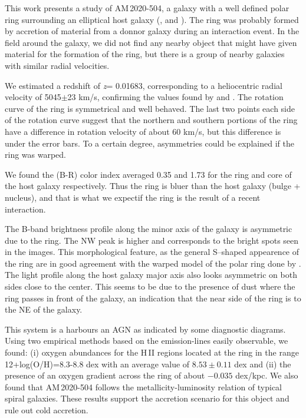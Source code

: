 \documentclass[useAMS,usenatbib]{mn2e}
\begin{document}
This work presents a study of \mbox{AM\,2020-504}, a galaxy with a well defined
polar ring surrounding an elliptical host galaxy (\citealt{1987IAUS..127..413W},
\citealt{1993A&A...267...21A} and \citealt{2002A&A...391..103I}). The ring was
probably formed by accretion of material from a donnor galaxy during an
interaction event. In the field around the galaxy, we did not find any nearby
object that might have given material for the formation of the ring, but there
is a group of nearby galaxies with similar radial velocities.

We estimated a redshift of \textit{z}= 0.01683, corresponding to a heliocentric
radial velocity of 5045$\pm$23 km/s, confirming the values found by
\cite{1987IAUS..127..413W} and \cite{1993A&A...267...21A}. The rotation curve of
the ring is symmetrical and well behaved. The last two points each side of the
rotation curve suggest that the northern and southern portions of the ring have
a difference in rotation velocity of about 60 km/s, but this difference is under
the error bars. To a certain degree, asymmetries could be explained if the ring
was warped.

We found the (B-R) color index averaged 0.35 and 1.73 for the ring and core of
the host galaxy respectively. Thus the ring is bluer than the host galaxy (bulge
+ nucleus), and that is what we expectif the ring is the result of a recent
interaction.

The B-band brightness profile along the minor axis of the
galaxy is asymmetric due to the ring. The NW peak is higher and corresponds to
the bright spots seen in the images. This morphological feature, as the general
S--shaped appearence of the ring are in good agreement with the warped model of
the polar ring done by \cite{1993A&A...267...21A}. The light profile along the
host galaxy major axis also looks asymmetric on both sides close to the center.
This seems to be due to the presence of dust where the ring passes in front of
the galaxy, an indication that the near side of the ring is to the NE of the
galaxy.

This system is a harbours an AGN as indicated by some diagnostic diagrams.  
Using two empirical methods based on the emission-lines easily observable, 
we found: (i) oxygen abundances  for the H\,II regions located at the ring  in
the range 12+log(O/H)=8.3-8.8 dex with an average value of $8.53\pm0.11$ dex and
(ii) the presence of an oxygen gradient across the ring of about $-0.035$
dex/kpc. We also found that  \mbox{AM\,2020-504}  follows the
metallicity-luminosity relation of typical spiral galaxies. These results
support the accretion scenario for this object and rule out cold accretion.
\end{document}
